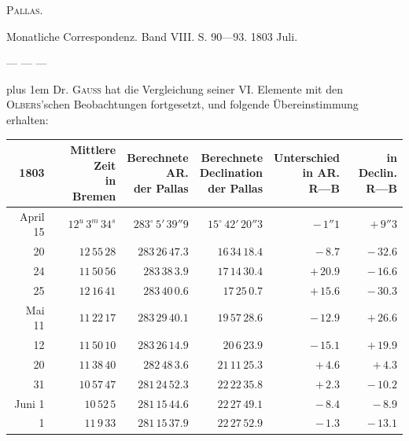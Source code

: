 \begin{flushright}
\end{flushright}
%
\begin{center}\textsc{Pallas.}\end{center}

\medskip
Monatliche Correspondenz. Band VIII. S. 90---93. 1803 Juli.

\medskip
— — —

\medskip
{\rightskip=0pt plus 1em
Dr. \textsc{Gauss} hat die Vergleichung seiner VI. Elemente mit den \textsc{Olbers}'schen Beobachtungen fortgesetzt, und folgende Übereinstimmung erhalten:\par}


\begin{center}
\begingroup\fontsize{9}{11}\selectfont\setlength{\tabcolsep}{3pt}\renewcommand{\arraystretch}{1.12}
\begin{tabular}{r|r|r|r|r|r}
1803 & \shortstack{Mittlere Zeit\\in\\Bremen} & \shortstack{Berechnete\\AR.\\der Pallas} & \shortstack{Berechnete\\Declination\\der Pallas} & \shortstack{Unterschied\\in AR.\\R—B} & \shortstack{in Declin.\\R—B} \\ \hline
April 15 & $12^u\,3^m\,34^s$ & $283^\circ\,5'\,39''9$ & $15^\circ\,42'\,20''3$ & $-\,1''1$ & $+\,9''3$ \\
20 & $12\,55\,28$ & $283\,26\,47.3$ & $16\,34\,18.4$ & $-\,8.7$ & $-\,32.6$ \\
24 & $11\,50\,56$ & $283\,38\,3.9$ & $17\,14\,30.4$ & $+\,20.9$ & $-\,16.6$ \\
25 & $12\,16\,41$ & $283\,40\,0.6$ & $17\,25\,0.7$ & $+\,15.6$ & $-\,30.3$ \\
Mai 11 & $11\,22\,17$ & $283\,29\,40.1$ & $19\,57\,28.6$ & $-\,12.9$ & $+\,26.6$ \\
12 & $11\,50\,10$ & $283\,26\,14.9$ & $20\,6\,23.9$ & $-\,15.1$ & $+\,19.9$ \\
20 & $11\,38\,40$ & $282\,48\,3.6$ & $21\,11\,25.3$ & $+\,4.6$ & $+\,4.3$ \\
31 & $10\,57\,47$ & $281\,24\,52.3$ & $22\,22\,35.8$ & $+\,2.3$ & $-\,10.2$ \\
Juni 1 & $10\,52\,5$ & $281\,15\,44.6$ & $22\,27\,49.1$ & $-\,8.4$ & $-\,8.9$ \\
1 & $11\,9\,33$ & $281\,15\,37.9$ & $22\,27\,52.9$ & $-\,1.3$ & $-\,13.1$ \\
\end{tabular}\endgroup
\end{center}

